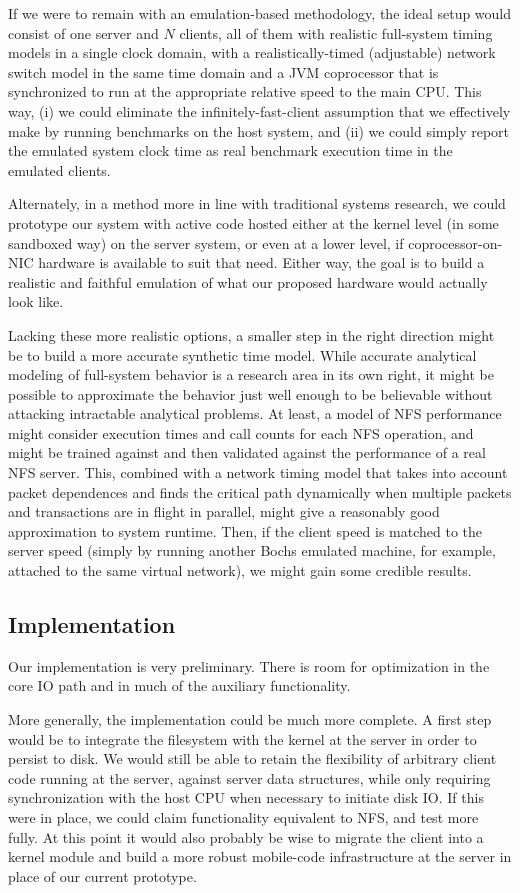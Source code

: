 \documentclass[10pt]{article}
\begin{document}
If we were to remain with an emulation-based methodology, the ideal
setup would consist of one server and $N$ clients, all of them with
realistic full-system timing models in a single clock domain, with a
realistically-timed (adjustable) network switch model in the same time
domain and a JVM coprocessor that is synchronized to run at the
appropriate relative speed to the main CPU. This way, (i) we could
eliminate the infinitely-fast-client assumption that we effectively
make by running benchmarks on the host system, and (ii) we could
simply report the emulated system clock time as real benchmark
execution time in the emulated clients.

Alternately, in a method more in line with traditional systems
research, we could prototype our system with active code hosted either
at the kernel level (in some sandboxed way) on the server system, or
even at a lower level, if coprocessor-on-NIC hardware is available to
suit that need. Either way, the goal is to build a realistic and
faithful emulation of what our proposed hardware would actually look
like.

Lacking these more realistic options, a smaller step in the right
direction might be to build a more accurate synthetic time
model. While accurate analytical modeling of full-system behavior is a
research area in its own right, it might be possible to approximate
the behavior just well enough to be believable without attacking
intractable analytical problems. At least, a model of NFS performance
might consider execution times and call counts for each NFS operation,
and might be trained against and then validated against the
performance of a real NFS server. This, combined with a network timing
model that takes into account packet dependences and finds the
critical path dynamically when multiple packets and transactions are
in flight in parallel, might give a reasonably good approximation to
system runtime. Then, if the client speed is matched to the server
speed (simply by running another Bochs emulated machine, for example,
attached to the same virtual network), we might gain some credible
results.

\subsection{Implementation}

Our implementation is very preliminary. There is room for optimization
in the core IO path and in much of the auxiliary functionality.

More generally, the implementation could be much more complete. A
first step would be to integrate the filesystem with the kernel at the
server in order to persist to disk. We would still be able to retain
the flexibility of arbitrary client code running at the server,
against server data structures, while only requiring synchronization
with the host CPU when necessary to initiate disk IO. If this were in
place, we could claim functionality equivalent to NFS, and test more
fully. At this point it would also probably be wise to migrate the
client into a kernel module and build a more robust mobile-code
infrastructure at the server in place of our current prototype.
\end{document}

